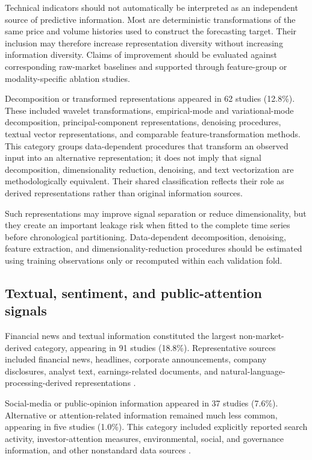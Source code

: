 \documentclass[pdflatex,sn-mathphys-num]{sn-jnl}%
\theoremstyle{thmstyleone}%
\theoremstyle{thmstyletwo}%
\theoremstyle{thmstylethree}%
\begin{document}
Technical indicators should not automatically be interpreted as an
independent source of predictive information. Most are deterministic
transformations of the same price and volume histories used to
construct the forecasting target. Their inclusion may therefore
increase representation diversity without increasing information
diversity. Claims of improvement should be evaluated against
corresponding raw-market baselines and supported through feature-group
or modality-specific ablation studies.

Decomposition or transformed \cite{P00059,P00434,P00544,P00625} representations appeared in 62 studies
(12.8\%). These included wavelet transformations, empirical-mode and
variational-mode decomposition, principal-component representations,
denoising procedures, textual vector representations, and comparable
feature-transformation methods. This category groups data-dependent procedures that transform an
observed input into an alternative representation; it does not imply
that signal decomposition, dimensionality reduction, denoising, and
text vectorization are methodologically equivalent. Their shared
classification reflects their role as derived representations rather
than original information sources.

Such representations may improve signal separation or reduce
dimensionality, but they create an important leakage risk when fitted
to the complete time series before chronological partitioning.
Data-dependent decomposition, denoising, feature extraction, and
dimensionality-reduction procedures should be estimated using training
observations only or recomputed within each validation fold.

\subsection{Textual, sentiment, and public-attention signals}
\label{subsec:textual-inputs}

Financial news and textual information constituted the largest
non-market-derived category, appearing in 91 studies (18.8\%).
Representative sources included financial news, headlines, corporate
announcements, company disclosures, analyst text, earnings-related
documents, and natural-language-processing-derived representations \cite{P00108,P00144,P00178,P00213,P00296,P00647}.

Social-media or public-opinion information appeared in 37 studies
(7.6\%). Alternative or attention-related information remained much
less common, appearing in five studies (1.0\%). This category
included explicitly reported search activity, investor-attention
measures, environmental, social, and governance information, and
other nonstandard data sources \cite{P00070,P00146,P00293,P00411,P00601}.
\end{document}

